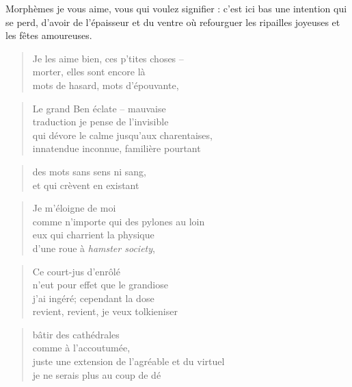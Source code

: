   Morphèmes je vous aime, vous qui voulez signifier : c’est ici bas une intention qui
  se perd, d’avoir de l’épaisseur et du ventre où refourguer les ripailles joyeuses et
  les fêtes amoureuses.
  \begin{verse}
    Je les aime bien, ces p’tites choses --\\
    morter, elles sont encore là\\
    mots de hasard, mots d’épouvante,
  \end{verse}
  \begin{verse}
    Le grand Ben éclate -- mauvaise\\
    traduction je pense de l’invisible\\
    qui dévore le calme jusqu’aux charentaises,\\
    innatendue inconnue, familière pourtant
  \end{verse}
  \begin{verse}
    des mots sans sens ni sang,\\
    et qui crèvent en existant
  \end{verse}
  \begin{center}
  \end{center}
  \begin{verse}
    Je m’éloigne de moi\\
    comme n’importe qui des pylones au loin\\
    eux qui charrient la physique\\
    d’une roue à \emph{hamster society},
  \end{verse}
  \begin{verse}
    Ce court-jus d’enrôlé\\
    n’eut pour effet que le grandiose\\
    j’ai ingéré; cependant la dose\\
    revient, revient, je veux tolkieniser
  \end{verse}
  \begin{verse}
    bâtir des cathédrales\\
    comme à l’accoutumée,\\
    juste une extension de l’agréable et du virtuel\\
    je ne serais plus au coup de dé
  \end{verse}
  \begin{center}
  \end{center}
